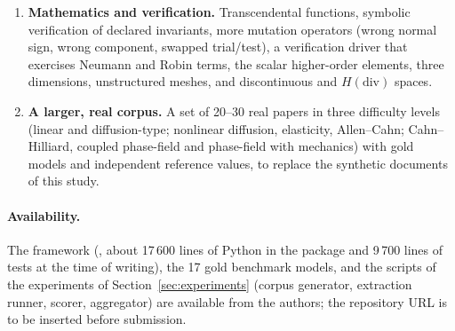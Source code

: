 \begin{enumerate}
\item \textbf{Mathematics and verification.} Transcendental functions, symbolic verification of declared invariants, more mutation operators (wrong normal sign, wrong component, swapped trial/test), a verification driver that exercises Neumann and Robin terms, the scalar higher-order elements, three dimensions, unstructured meshes, and discontinuous and $H(\mathrm{div})$ spaces.
\item \textbf{A larger, real corpus.} A set of 20--30 real papers in three difficulty levels (linear and diffusion-type; nonlinear diffusion, elasticity, Allen--Cahn; Cahn--Hilliard, coupled phase-field and phase-field with mechanics) with gold models and independent reference values, to replace the synthetic documents of this study.
\end{enumerate}
\paragraph{Availability.} The framework (, about 17\,600 lines of Python in the package and 9\,700 lines of tests at the time of writing), the 17 gold benchmark models, and the scripts of the experiments of Section~\ref{sec:experiments} (corpus generator, extraction runner, scorer, aggregator) are available from the authors; the repository URL is to be inserted before submission.
